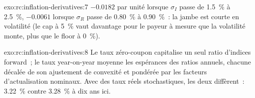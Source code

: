 \begin{solution}{exo:rc:inflation-derivatives:7}
$-0.0182$ par unité lorsque $\sigma_I$ passe de 1.5~\% à 2.5~\%, $-0.0061$ lorsque $\sigma_R$ passe de 0.80~\%
à 0.90~\%~: la jambe est courte en volatilité (le cap à 5~\% vaut davantage pour le payeur à mesure que la volatilité
monte, plus que le floor à 0~\%).
\end{solution}

\begin{solution}{exo:rc:inflation-derivatives:8}
Le taux zéro-coupon capitalise un seul ratio d'indices forward~; le taux year-on-year moyenne
les espérances des ratios annuels, chacune décalée de son ajustement de convexité et pondérée par
les facteurs d'actualisation nominaux. Avec des taux réels stochastiques, les deux diffèrent~: 3.22~\% contre 3.28~\% à
dix ans ici.
\end{solution}

